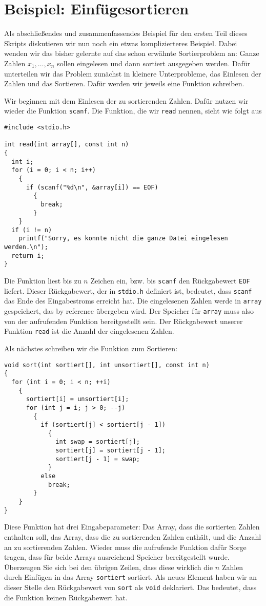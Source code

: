 \section{Beispiel: Einfügesortieren}

Als abschließendes und zusammenfassendes Beispiel für den ersten Teil dieses Skripts diskutieren wir nun noch ein etwas komplizierteres Beispiel.
Dabei wenden wir das bisher gelernte auf das schon erwähnte Sortierproblem an:
Ganze Zahlen $x_1, \ldots, x_n$ sollen eingelesen und dann sortiert ausgegeben werden.
Dafür unterteilen wir das Problem zunächst in kleinere Unterprobleme, das Einlesen der Zahlen und das Sortieren.
Dafür werden wir jeweils eine Funktion schreiben.

Wir beginnen mit dem Einlesen der zu sortierenden Zahlen.
Dafür nutzen wir wieder die Funktion \verb|scanf|.
Die Funktion, die wir \verb|read| nennen, sieht wie folgt aus
\begin{lstlisting}
#include <stdio.h>

int read(int array[], const int n)
{
  int i;
  for (i = 0; i < n; i++)
    {
      if (scanf("%d\n", &array[i]) == EOF)
        {
          break;
        }
    }
  if (i != n)
    printf("Sorry, es konnte nicht die ganze Datei eingelesen werden.\n");
  return i;
}
\end{lstlisting}
Die Funktion liest bis zu $n$ Zeichen ein, bzw. bis \verb|scanf| den Rückgabewert \verb|EOF| liefert.
Dieser Rückgabewert, der in \verb|stdio.h| definiert ist, bedeutet, dass \verb|scanf| das Ende des Eingabestroms erreicht hat.
Die eingelesenen Zahlen werde in \verb|array| gespeichert, das by reference übergeben wird.
Der Speicher für \verb|array| muss also von der aufrufenden Funktion bereitgestellt sein.
Der Rückgabewert unserer Funktion \verb|read| ist die Anzahl der eingelesenen Zahlen.

Als nächstes schreiben wir die Funktion zum Sortieren:
\begin{lstlisting}
void sort(int sortiert[], int unsortiert[], const int n)
{
  for (int i = 0; i < n; ++i)
    {
      sortiert[i] = unsortiert[i];
      for (int j = i; j > 0; --j)
        {
          if (sortiert[j] < sortiert[j - 1])
            {
              int swap = sortiert[j];
              sortiert[j] = sortiert[j - 1];
              sortiert[j - 1] = swap;
            }
          else
            break;
        }
    }
}
\end{lstlisting}
Diese Funktion hat drei Eingabeparameter: Das Array, dass die sortierten Zahlen enthalten soll, das Array, dass die zu sortierenden Zahlen enthält, und die Anzahl an zu sortierenden Zahlen.
Wieder muss die aufrufende Funktion dafür Sorge tragen, dass für beide Arrays ausreichend Speicher bereitgestellt wurde.
Überzeugen Sie sich bei den übrigen Zeilen, dass diese wirklich die $n$ Zahlen durch Einfügen in das Array \verb|sortiert| sortiert.
Als neues Element haben wir an dieser Stelle den Rückgabewert von \verb|sort| als \verb|void| deklariert.
Das bedeutet, dass die Funktion keinen Rückgabewert hat.


